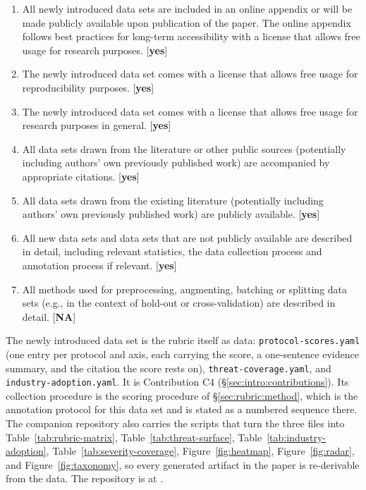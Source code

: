 \begin{enumerate}
    \item
    All newly introduced data sets
    are included in an online appendix
    or will be made publicly available upon publication of the paper.
    The online appendix follows best practices for long-term accessibility with a license
    that allows free usage for research purposes.
    [\textbf{yes}]
    \item The newly introduced data set comes with a license that
    allows free usage for reproducibility purposes.
    [\textbf{yes}]
    \item The newly introduced data set comes with a license that
    allows free usage for research purposes in general.
    [\textbf{yes}]
    \item All data sets drawn from the literature or other public sources (potentially including authors' own previously published work) are accompanied by appropriate citations.
    [\textbf{yes}]
    \item All data sets drawn from the existing literature (potentially including authors' own previously published work) are publicly available. [\textbf{yes}]
    \item All new data sets and data sets that are not publicly available are described in detail, including relevant statistics, the data collection process and annotation process if relevant.
    [\textbf{yes}]
    \item
    All methods used for preprocessing, augmenting, batching or splitting data sets (e.g., in the context of hold-out or cross-validation)
    are described in detail. [\textbf{NA}]
\end{enumerate}

\noindent The newly introduced data set is the rubric itself as data:
\texttt{protocol-scores.yaml} (one entry per protocol and axis, each carrying
the score, a one-sentence evidence summary, and the citation the score rests
on), \texttt{threat-coverage.yaml}, and \texttt{industry-adoption.yaml}. It is
Contribution C4 (\S\ref{sec:intro:contributions}). Its collection procedure is
the scoring procedure of \S\ref{sec:rubric:method}, which is the annotation
protocol for this data set and is stated as a numbered sequence there. The
companion repository also carries the scripts that turn the three files into
Table~\ref{tab:rubric-matrix}, Table~\ref{tab:threat-surface},
Table~\ref{tab:industry-adoption}, Table~\ref{tab:severity-coverage},
Figure~\ref{fig:heatmap}, Figure~\ref{fig:radar}, and
Figure~\ref{fig:taxonomy}, so every generated artifact in the paper is
re-derivable from the data. The repository is at \companionrepo.

